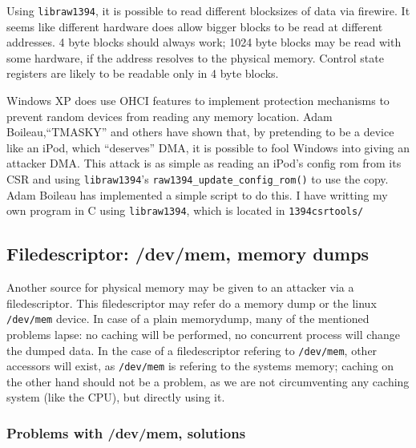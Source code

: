Using \texttt{libraw1394}, it is possible to read different blocksizes of data
via firewire.  It seems like different hardware does allow bigger blocks to be
read at different addresses. 4 byte blocks should always work; 1024 byte blocks
may be read with some hardware, if the address resolves to the physical memory.
Control state registers are likely to be readable only in 4 byte blocks.

\label{windows-dma} Windows XP does use OHCI features to implement protection
mechanisms to prevent random devices from reading any memory location.  Adam
Boileau,``TMASKY'' and others have shown \cite{rux2k6firewire:2006} that, by
pretending to be a device like an iPod, which ``deserves'' DMA, it is possible
to fool Windows into giving an attacker DMA.  This attack is as simple as
reading an iPod's config rom from its CSR and using \texttt{libraw1394}'s
\texttt{raw1394\_update\_config\_rom()} to use the copy.  Adam Boileau has
implemented a simple script to do this. I have writting my own program in C
using \texttt{libraw1394}, which is located in \texttt{1394csrtools/}



\subsection{Filedescriptor: /dev/mem, memory dumps}

Another source for physical memory may be given to an attacker via a
filedescriptor. This filedescriptor may refer do a memory dump or the linux
\texttt{/dev/mem} device. In case of a plain memorydump, many of the mentioned
problems lapse: no caching will be performed, no concurrent process will change
the dumped data. In the case of a filedescriptor refering to \texttt{/dev/mem},
other accessors will exist, as \texttt{/dev/mem} is refering to the systems
memory; caching on the other hand should not be a problem, as we are not
circumventing any caching system (like the CPU), but directly using it.

\subsubsection{Problems with /dev/mem, solutions}

